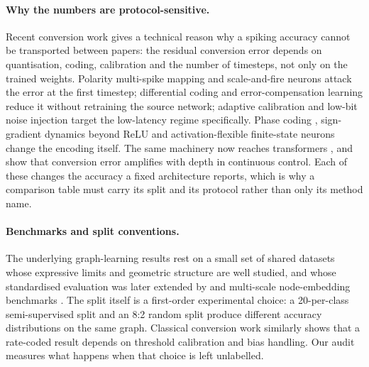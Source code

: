 \documentclass[10pt,twocolumn]{article}
\begin{document}
\paragraph{Why the numbers are protocol-sensitive.} Recent conversion work gives a technical reason
why a spiking accuracy cannot be transported between papers: the residual conversion error depends
on quantisation, coding, calibration and the number of timesteps, not only on the trained weights.
Polarity multi-spike mapping \citep{zhang2025quantization} and scale-and-fire neurons
\citep{chen2025onetimestep} attack the error at the first timestep; differential coding
\citep{huang2025differential} and error-compensation learning \citep{liu2025errorcomp} reduce it
without retraining the source network; adaptive calibration \citep{wang2024adaptivecal} and low-bit
noise injection \citep{li2024noiseadaptor} target the low-latency regime specifically. Phase coding
\citep{hwang2024onespike}, sign-gradient dynamics beyond ReLU \citep{oh2024signgd} and
activation-flexible finite-state neurons \citep{jia2026activation} change the encoding itself. The
same machinery now reaches transformers \citep{huang2025spiketrans,wang2025trainingfree}, and
\citet{xu2026erroramp} show that conversion error amplifies with depth in continuous control. Each
of these changes the accuracy a fixed architecture reports, which is why a comparison table must
carry its split and its protocol rather than only its method name.

\paragraph{Benchmarks and split conventions.} The underlying graph-learning results rest on a small
set of shared datasets \citep{kipf2017semi,velickovic2018graph,hamilton2017inductive} whose
expressive limits \citep{xu2019powerful} and geometric structure \citep{pei2020geom} are well
studied, and whose standardised evaluation was later extended by \citet{hu2020open} and multi-scale
node-embedding benchmarks \citep{rozemberczki2021multi}. The split itself is a first-order
experimental choice: a 20-per-class semi-supervised split and an 8:2 random split produce different
accuracy distributions on the same graph. Classical conversion work
\citep{diehl2015fast,rueckauer2017conversion,sengupta2019going,bu2022optimal,deng2021optimal,
hao2023offset,wu2024ftbc,bojkovic2025temporal} similarly shows that a rate-coded result depends on
threshold calibration and bias handling. Our audit measures what happens when that choice is left
unlabelled.
\end{document}
